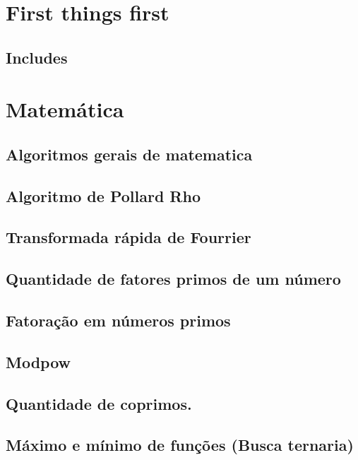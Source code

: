 \section{First things first}
\subsection{Includes}
\raggedbottom
\clearpage
\clearpage
\section{Matemática}
\subsection{Algoritmos gerais de matematica}
\raggedbottom
\clearpage
\subsection{Algoritmo de Pollard Rho}
\raggedbottom
\clearpage
\subsection{Transformada rápida de Fourrier}
\raggedbottom
\clearpage
\subsection{Quantidade de fatores primos de um número}
\raggedbottom
\clearpage
\subsection{Fatoração em números primos}
\raggedbottom
\clearpage
\subsection{Modpow}
\raggedbottom
\clearpage
\subsection{Quantidade de coprimos.}
\raggedbottom
\clearpage
\subsection{Máximo e mínimo de funções (Busca ternaria)}
\raggedbottom
\clearpage
